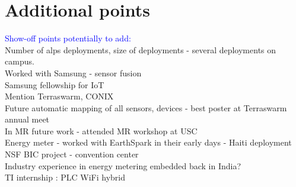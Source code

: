 \documentclass[10pt]{article}
\begin{document}




\section{Additional points}
\textcolor{blue}{Show-off points potentially to add:}\\
Number of alps deployments, size of deployments - several deployments on campus.\\
Worked with Samsung - sensor fusion\\
Samsung fellowship for IoT\\
Mention Terraswarm, CONIX\\
Future automatic mapping of all sensors, devices - best poster at Terraswarm annual meet\\
In MR future work - attended MR workshop at USC\\
Energy meter - worked with EarthSpark in their early days - Haiti deployment\\
NSF BIC project - convention center\\
Industry experience in energy metering embedded back in India?\\
TI internship : PLC WiFi hybrid



\small


\end{document}

